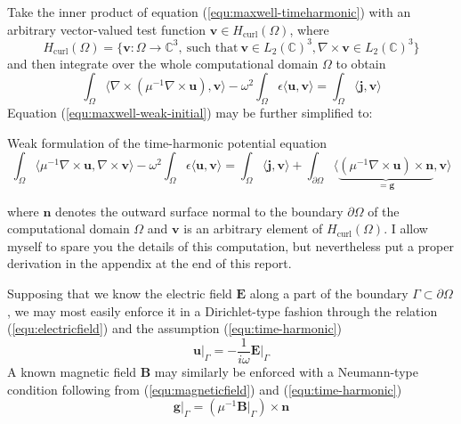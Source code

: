 \documentclass[11pt, a4paper]{article}
\begin{document}
Take the inner product of equation (\ref{equ:maxwell-timeharmonic}) with an arbitrary
vector-valued test function $\mathbf{v} \in H_{\textrm{curl}}(\Omega)$, where
\begin{equation}
    H_{\textrm{curl}}(\Omega) = \{\mathbf{v} : \Omega \to \mathbb{C}^3,~\text{such that}~\mathbf{v}\in L_2(\mathbb{C})^3, \nabla \times \mathbf{v} \in L_2(\mathbb{C})^3\} \label{equ:h-curl}
\end{equation}
and then integrate over the whole computational domain $\Omega$ to obtain 
\begin{equation}
    \int_{\Omega} \langle \nabla \times ({\mu^{-1} \nabla \times \mathbf{u}}), \mathbf{v} \rangle
    - \omega^2 \int_{\Omega} \epsilon \langle \mathbf{u}, \mathbf{v} \rangle =
    \int_{\Omega} \langle \mathbf{j}, \mathbf{v} \rangle \label{equ:maxwell-weak-initial}
\end{equation}
Equation (\ref{equ:maxwell-weak-initial}) may be further simplified to:
\begin{fancybox}{Weak formulation of the time-harmonic potential equation}
    \begin{equation}
        \int_{\Omega} \langle {\mu^{-1} \nabla \times \mathbf{u}}, \nabla \times \mathbf{v} \rangle
        - \omega^2 \int_{\Omega} \epsilon \langle \mathbf{u}, \mathbf{v} \rangle
        = \int_{\Omega} \langle \mathbf{j}, \mathbf{v} \rangle
        + \int_{\partial \Omega} \langle \underbrace{({\mu^{-1} \nabla \times \mathbf{u}}) \times \mathbf{n}}_{= \mathbf{g}}, \mathbf{v} \rangle
        \label{equ:maxwell-weak}
    \end{equation}
\end{fancybox}
where $\mathbf{n}$ denotes the outward surface normal to the boundary $\partial \Omega$
of the computational domain $\Omega$ and $\mathbf{v}$ is an arbitrary element
of $H_{\textrm{curl}}(\Omega)$. I allow myself
to spare you the details of this computation, but nevertheless put a proper derivation
in the appendix at the end of this report.

Supposing that we know the electric field $\mathbf{E}$ along a part of the
boundary $\Gamma \subset \partial \Omega$, we may most easily enforce it
in a Dirichlet-type fashion through the relation (\ref{equ:electricfield}) and
the assumption (\ref{equ:time-harmonic})
\begin{equation}
    \left.\mathbf{u}\right|_{\Gamma} = -\frac{1}{i\omega} \left.\mathbf{E}\right|_{\Gamma} \label{equ:dirichlet-boundary}
\end{equation}
A known magnetic field $\mathbf{B}$ may similarly be enforced
with a Neumann-type condition following
from (\ref{equ:magneticfield}) and (\ref{equ:time-harmonic})
\begin{equation}
    \left.\mathbf{g}\right|_{\Gamma} = (\mu^{-1} \left.\mathbf{B}\right|_{\Gamma}) \times \mathbf{n} \label{equ:neumann-boundary}
\end{equation}
\end{document}

